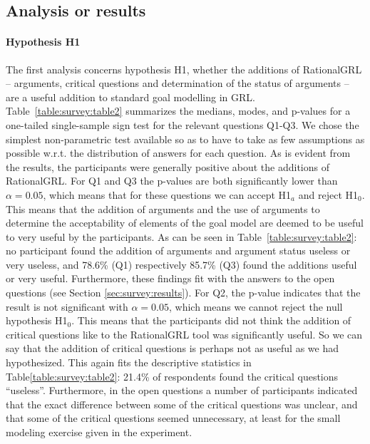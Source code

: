 \subsection{Analysis or results}\label{sect:validation:analysis}

\paragraph{Hypothesis H1}
The first analysis concerns hypothesis H1, whether the additions of RationalGRL -- arguments, critical questions and determination of the status of arguments -- are a useful addition to standard goal modelling in GRL. Table~\ref{table:survey:table2} summarizes the medians, modes, and p-values for a one-tailed single-sample sign test for the relevant questions Q1-Q3. We chose the simplest non-parametric test available so as to have to take as few assumptions as possible w.r.t. the distribution of answers for each question. As is evident from the results, the participants were generally positive about the additions of RationalGRL. For Q1 and Q3 the p-values are both significantly lower than $\alpha = 0.05$, which means that for these questions we can accept H1$_{a}$ and reject H1$_{0}$. This means that the addition of arguments and the use of arguments to determine the acceptability of elements of the goal model are deemed to be useful to very useful by the participants. As can be seen in Table~\ref{table:survey:table2}: no participant found the addition of arguments and argument status useless or very useless, and 78.6\% (Q1) respectively 85.7\% (Q3) found the additions useful or very useful. Furthermore, these findings fit with the answers to the open questions (see Section \ref{sec:survey:results}). For Q2, the p-value indicates that the result is not significant with $\alpha = 0.05$, which means we cannot reject the null hypothesis H1$_{0}$. This means that the participants did not think the addition of critical questions like to the RationalGRL tool was significantly useful. So we can say that the addition of critical questions is perhaps not as useful as we had hypothesized. This again fits the descriptive statistics in Table\ref{table:survey:table2}: 21.4\% of respondents found the critical questions ``useless''. Furthermore, in the open questions a number of participants indicated that the exact difference between some of the critical questions was unclear, and that some of the critical questions seemed unnecessary, at least for the small modeling exercise given in the experiment.


